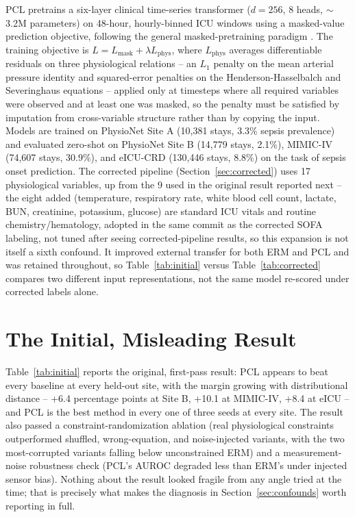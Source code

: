 \documentclass[pmlr,twocolumn,10pt]{jmlr} %
\begin{document}
PCL pretrains a six-layer clinical time-series transformer ($d{=}256$, 8
heads, $\sim$3.2M parameters) on 48-hour, hourly-binned ICU windows using a
masked-value prediction objective, following the general masked-pretraining
paradigm \citep{vaswani2017attention,devlin2019bert}. The training objective
is $L = L_{\mathrm{mask}} + \lambda L_{\mathrm{phys}}$, where
$L_{\mathrm{phys}}$ averages differentiable residuals on three physiological
relations -- an $L_1$ penalty on the mean arterial pressure identity and
squared-error penalties on the Henderson-Hasselbalch and Severinghaus
equations -- applied only at timesteps where all required variables were
observed and at least one was masked, so the penalty must be satisfied by
imputation from cross-variable structure rather than by copying the input.
Models are trained on PhysioNet Site A (10,381 stays, 3.3\% sepsis
prevalence) and evaluated zero-shot on PhysioNet Site B (14,779 stays,
2.1\%), MIMIC-IV (74,607 stays, 30.9\%), and eICU-CRD (130,446 stays,
8.8\%) on the task of sepsis onset prediction. The corrected pipeline
(Section~\ref{sec:corrected}) uses 17 physiological variables, up from the
9 used in the original result reported next -- the eight added (temperature,
respiratory rate, white blood cell count, lactate, BUN, creatinine,
potassium, glucose) are standard ICU vitals and routine
chemistry/hematology, adopted in the same commit as the corrected SOFA
labeling, not tuned after seeing corrected-pipeline results, so this
expansion is not itself a sixth confound. It improved external transfer for
both ERM and PCL and was retained throughout, so Table~\ref{tab:initial}
versus Table~\ref{tab:corrected} compares two different input
representations, not the same model re-scored under corrected labels
alone.

\section{The Initial, Misleading Result}
\label{sec:initial}

Table~\ref{tab:initial} reports the original, first-pass result: PCL appears
to beat every baseline at every held-out site, with the margin growing with
distributional distance -- +6.4 percentage points at Site B, +10.1 at
MIMIC-IV, +8.4 at eICU -- and PCL is the best method in every one of three
seeds at every site. The result also passed a constraint-randomization
ablation (real physiological constraints outperformed shuffled,
wrong-equation, and noise-injected variants, with the two most-corrupted
variants falling below unconstrained ERM) and a measurement-noise robustness
check (PCL's AUROC degraded less than ERM's under injected sensor bias).
Nothing about the result looked fragile from any angle tried at the time;
that is precisely what makes the diagnosis in Section~\ref{sec:confounds}
worth reporting in full.
\end{document}
